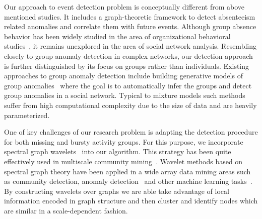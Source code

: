 Our approach to event detection problem is conceptually different from above mentioned studies. It includes a graph-theoretic framework to detect absenteeism related anomalies and correlate them with future events. Although group absence behavior has been widely studied in the area of organizational behavioral studies~\cite{gaudine2001effects,seamonds1982stress}, it remains unexplored in the area of social network analysis. Resembling closely to group anomaly detection in complex networks, our detection approach is further distinguished by its focus on groups rather than individuals. Existing approaches to group anomaly detection include building generative models of group anomalies~\cite{xiong2011hierarchical,yu2014glad} where the goal is to automatically infer the groups and detect group anomalies in a social network. Typical to mixture models such methods suffer from high computational complexity due to the size of data and are heavily parameterized.

One of key challenges of our research problem is adapting the detection procedure for both missing and bursty activity groups. For this purpose, we incorporate spectral graph wavelets~\cite{hammond2011wavelets} into our algorithm. This strategy has been quite effectively used in multiscale community mining~\cite{tremblay2014graph}.
Wavelet methods based on spectral graph theory have been applied in a wide array data mining areas such as community detection, anomaly detection~\cite{calderara2011detecting} and other machine learning tasks~\cite{shuman_ACHA_2013,ghosh2003wavelet,rustamov2013wavelets,2000wavecluster}. By constructing wavelets over graphs we are able take advantage of local information encoded in graph structure and then cluster and identify nodes which are similar in a scale-dependent fashion.

